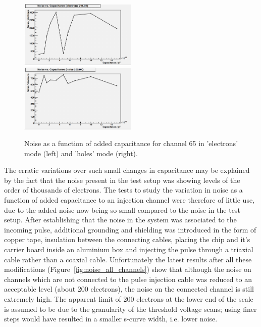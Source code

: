 \begin{figure}[hbtp]
   \centering
     \includegraphics[width=0.5\textwidth]{Chapters/07_Appendices/07c_2_Images/noise_v_capacitance_ch_65_electrons}\hfill
     \includegraphics[width=0.5\textwidth]{Chapters/07_Appendices/07c_2_Images/noise_v_capacitance_ch_65_holes}\hfill
     \caption{Noise as a function of added capacitance for channel 65 in 'electrons' mode (left) and 'holes'
     mode (right).}
     \label{fig:noise_v_capacitance}
\end{figure}

The erratic variations over such small changes in capacitance may be explained by the fact that the noise
present in the test setup was showing levels of the order of thousands of electrons. The tests to study
the variation in noise as a function of added capacitance to an injection channel were therefore of little
use, due to the added noise now being so small compared to the noise in the test setup. After establishing
that the noise in the system was associated to the incoming pulse, additional grounding and shielding was
introduced in the form of copper tape, insulation between the connecting cables, placing the chip and it's
carrier board inside an aluminium box and injecting the pulse through a triaxial cable rather than a coaxial
cable. Unfortunately the latest results after all these modifications (Figure~\ref{fig:noise_all_channels})
show that although the noise on channels which are not connected to the pulse injection cable was reduced
to an acceptable level (about 200 electrons), the noise on the connected channel is still extremely high.
The apparent limit of 200 electrons at the lower end of the scale is assumed to be due to the granularity of
the threshold voltage scans; using finer steps would have resulted in a smaller s-curve width, i.e. lower
noise.


